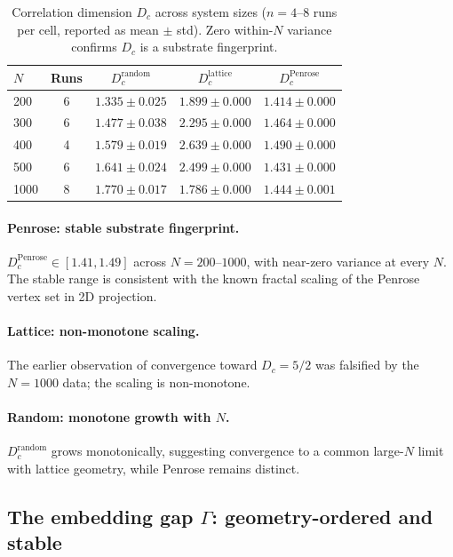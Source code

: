\documentclass[12pt,a4paper]{article}
\theoremstyle{plain}
\theoremstyle{definition}
\begin{document}
\begin{table}[H]
\centering
\caption{Correlation dimension $D_c$ across system sizes ($n = 4$--$8$ runs per cell,
  reported as mean $\pm$ std). Zero within-$N$ variance confirms $D_c$ is a
  substrate fingerprint.}
\label{tab:dc_scaling}
\begin{tabular}{lcccc}
\toprule
$N$ & Runs & $D_c^{\text{random}}$ & $D_c^{\text{lattice}}$ &
  $D_c^{\text{Penrose}}$ \\
\midrule
200  & 6 & $1.335 \pm 0.025$ & $1.899 \pm 0.000$ & $1.414 \pm 0.000$ \\
300  & 6 & $1.477 \pm 0.038$ & $2.295 \pm 0.000$ & $1.464 \pm 0.000$ \\
400  & 4 & $1.579 \pm 0.019$ & $2.639 \pm 0.000$ & $1.490 \pm 0.000$ \\
500  & 6 & $1.641 \pm 0.024$ & $2.499 \pm 0.000$ & $1.431 \pm 0.000$ \\
1000 & 8 & $1.770 \pm 0.017$ & $1.786 \pm 0.000$ & $1.444 \pm 0.001$ \\
\bottomrule
\end{tabular}
\end{table}

\paragraph{Penrose: stable substrate fingerprint.}
$D_c^{\text{Penrose}} \in [1.41, 1.49]$ across $N = 200$--$1000$, with
near-zero variance at every $N$. The stable range is consistent with the
known fractal scaling of the Penrose vertex set in 2D projection.

\paragraph{Lattice: non-monotone scaling.}
The earlier observation of convergence toward $D_c = 5/2$ was falsified by
the $N = 1000$ data; the scaling is non-monotone.

\paragraph{Random: monotone growth with $N$.}
$D_c^{\text{random}}$ grows monotonically, suggesting convergence to a
common large-$N$ limit with lattice geometry, while Penrose remains distinct.

\subsection{The embedding gap $\Gamma$: geometry-ordered and stable}
\end{document}
